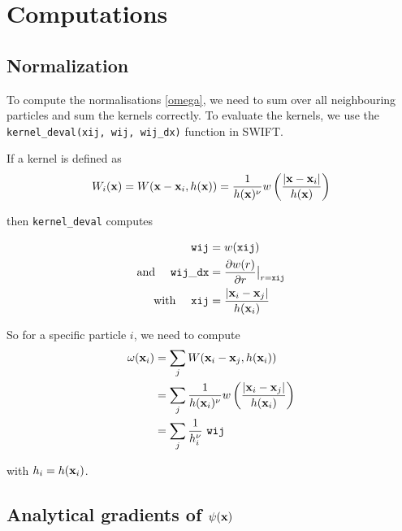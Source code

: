 \section{Computations}





\subsection{Normalization}


To compute the normalisations \ref{omega}, we need to sum over all neighbouring particles and sum the kernels correctly.
To evaluate the kernels, we use the \verb|kernel_deval(xij, wij, wij_dx)| function in SWIFT.

If a kernel is defined as
\begin{align*}
	W_i(\mathbf{x}) = W(\mathbf{x} - \mathbf{x}_i, h(\mathbf{x})) = \frac{1}{h(\mathbf{x})^\nu} w\left(\frac{| \mathbf{x} - \mathbf{x}_i |}{h(\mathbf{x})} \right)
\end{align*}

then \verb|kernel_deval| computes 

\begin{align*}
	\mathtt{wij} &= w(\mathtt{xij}) \\
	\text{and \quad} \mathtt{wij\_dx} &= \frac{\partial w(r)}{\partial r} \big{|} _{r = \mathtt{xij}} \\ 
	\text{with \quad} \mathtt{xij} &= \frac{| \mathbf{x}_i - \mathbf{x}_j |}{h(\mathbf{x}_i)}
\end{align*}



So for a specific particle $i$, we need to compute
\begin{align*}
	\omega(\x_i) 	&= \sum_j W(\x_i - \x_j, h(\x_i)) \\
					&= \sum_j \frac{1}{h(\x_i)^\nu} w\left( \frac{| \x_i - \x_j |}{h(\x_i)} \right) \\
					&= \sum_j \frac{1}{h_i^\nu} \ \mathtt{ wij }
\end{align*}


with $h_i = h(\mathbf{x}_i)$.








\subsection{Analytical gradients of $\psi(\mathbf{x})$}

